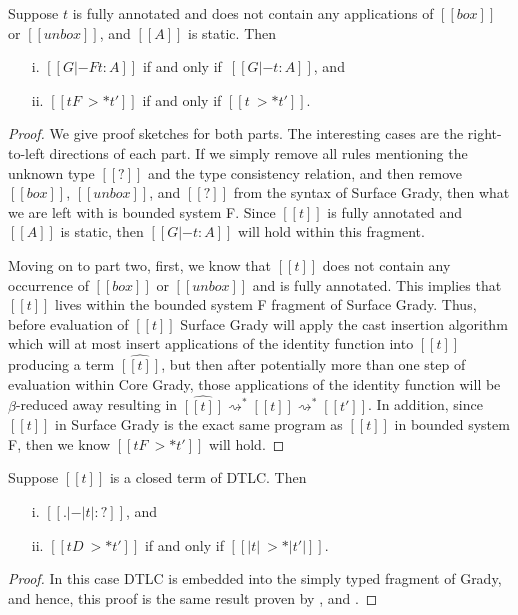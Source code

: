 \begin{lemma}
  \label{lemma:F-inclusion}
  Suppose $t$ is fully annotated and does not contain any applications
  of $[[box]]$ or $[[unbox]]$, and $[[A]]$ is static.  Then
  \begin{itemize}
  \item[i.] $[[G |-F t : A]]$ if and only if $\,[[G |- t : A]]$, and 
  \item[ii.] $[[t F~>* t']]$ if and only if $[[t ~>* t']]$.
  \end{itemize}
\end{lemma}
\begin{proof}
  We give proof sketches for both parts.  The interesting cases are
  the right-to-left directions of each part.  If we simply remove all
  rules mentioning the unknown type $[[?]]$ and the type consistency
  relation, and then remove $[[box]]$, $[[unbox]]$, and $[[?]]$ from
  the syntax of Surface Grady, then what we are left with is bounded
  system F.  Since $[[t]]$ is fully annotated and $[[A]]$ is static,
  then $[[G |- t : A]]$ will hold within this fragment.

  Moving on to part two, first, we know that $[[t]]$ does not contain
  any occurrence of $[[box]]$ or $[[unbox]]$ and is fully annotated.
  This implies that $[[t]]$ lives within the bounded system F fragment
  of Surface Grady. Thus, before evaluation of $[[t]]$ Surface Grady
  will apply the cast insertion algorithm which will at most insert
  applications of the identity function into $[[t]]$ producing a term
  $\widehat{[[t]]}$, but then after potentially more than one step of
  evaluation within Core Grady, those applications of the identity
  function will be $\beta$-reduced away resulting in $\widehat{[[t]]}
  \rightsquigarrow^* [[t]] \rightsquigarrow^* [[t']]$.  In addition,
  since $[[t]]$ in Surface Grady is the exact same program as $[[t]]$
  in bounded system F, then we know $[[t F~>* t']]$ will hold.
\end{proof}

\begin{lemma}
  \label{lemma:inclusion_of_dtlc}
  Suppose $[[t]]$ is a closed term of DTLC. Then
  \begin{itemize}
  \item[i.] $[[. |- |t| : ?]]$, and
  \item[ii.] $[[t D~>* t']]$ if and only if $[[|t| ~>* |t'|]]$.
  \end{itemize}
\end{lemma}
\begin{proof}
  In this case DTLC is embedded into the simply typed fragment of
  Grady, and hence, this proof is the same result proven by
  \cite{Siek:2006}, and \cite{Siek:2015}.
\end{proof}

